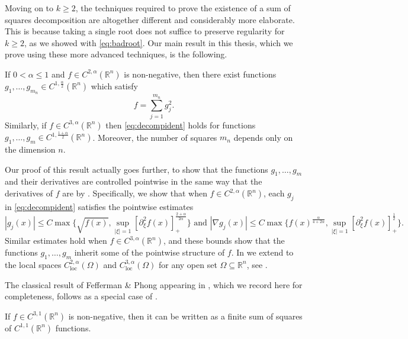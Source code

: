 \documentclass[oneside,hidelinks,indentfirst,10pt]{book}
\begin{document}
Moving on to \(k\geq 2\), the techniques required to prove the existence of a sum of squares decomposition are altogether different and considerably more elaborate. This is because taking a single root does not suffice to preserve regularity for \(k\geq 2\), as we showed with \eqref{eq:badroot}. Our main result in this thesis, which we prove using these more advanced techniques, is the following.


\begin{thm}\label{thm:c3main}
If \(0<\alpha\leq1\) and \(f\in C^{2,\alpha}(\mathbb{R}^n)\) is non-negative, then there exist functions \(g_1,\dots, g_{m_n}\in C^{1,\frac{\alpha}{2}}(\mathbb{R}^n)\) which satisfy
\begin{equation}\label{eq:decompident}
    f=\sum_{j=1}^{m_n}g_j^2.
\end{equation}
Similarly, if \(f\in C^{3,\alpha}(\mathbb{R}^n)\) then \eqref{eq:decompident} holds for functions \(g_1,\dots, g_m\in C^{1,\frac{1+\alpha}{2}}(\mathbb{R}^n)\). Moreover, the number of squares \(m_n\) depends only on the dimension \(n\). 
\end{thm}


Our proof of this result actually goes further, to show that the functions \(g_1,\dots,g_m\) and their derivatives are controlled pointwise in the same way that the derivatives of \(f\) are by . Specifically, we show that when \(f\in C^{2,\alpha}(\mathbb{R}^n)\), each \(g_j\) in \eqref{eq:decompident} satisfies the pointwise estimates
\[
    |g_j(x)|\leq C\max\bigg\{\sqrt{f(x)},\sup_{|\xi|=1}[\partial^2_\xi f(x)]_+^\frac{2+\alpha}{2\alpha}\bigg\}\textrm{ and }|\nabla g_j(x)|\leq C\max\bigg\{f(x)^\frac{\alpha}{4+2\alpha},\sup_{|\xi|=1}[\partial^2_\xi f(x)]_+^\frac{1}{2}\bigg\}.
\]
Similar estimates hold when \(f\in C^{3,\alpha}(\mathbb{R}^n)\), and these bounds show that the functions \(g_1,\dots,g_m\) inherit some of the pointwise structure of \(f\). In  we extend  to the local spaces \(C^{2,\alpha}_\mathrm{loc}(\Omega)\) and \(C^{3,\alpha}_\mathrm{loc}(\Omega)\) for any open set \(\Omega\subseteq\mathbb{R}^n\), see .


The classical result of Fefferman \& Phong appearing in \cite{Fefferman-Phong}, which we record here for completeness, follows as a special case of .


\begin{cor}\label{cor:FP}
If \(f\in C^{3,1}(\mathbb{R}^n)\) is non-negative, then it can be written as a finite sum of squares of \(C^{1,1}(\mathbb{R}^n)\) functions.
\end{cor}
\end{document}
